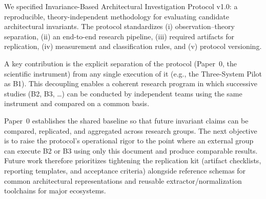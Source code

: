 We specified Invariance-Based Architectural Investigation Protocol v1.0: a reproducible, theory-independent methodology for evaluating candidate architectural invariants. The protocol standardizes (i) observation--theory separation, (ii) an end-to-end research pipeline, (iii) required artifacts for replication, (iv) measurement and classification rules, and (v) protocol versioning.

A key contribution is the explicit separation of the protocol (Paper~0, the scientific instrument) from any single execution of it (e.g., the Three-System Pilot as B1). This decoupling enables a coherent research program in which successive studies (B2, B3, \ldots) can be conducted by independent teams using the same instrument and compared on a common basis.

Paper~0 establishes the shared baseline so that future invariant claims can be compared, replicated, and aggregated across research groups. The next objective is to raise the protocol's operational rigor to the point where an external group can execute B2 or B3 using only this document and produce comparable results. Future work therefore prioritizes tightening the replication kit (artifact checklists, reporting templates, and acceptance criteria) alongside reference schemas for common architectural representations and reusable extractor/normalization toolchains for major ecosystems.
